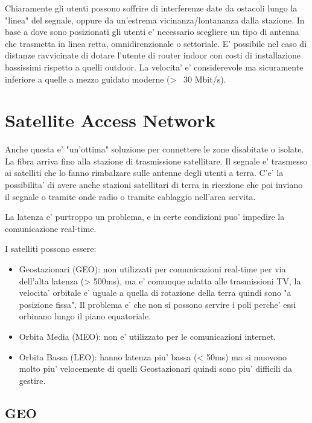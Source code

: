 
Chiaramente gli utenti possono soffrire di interferenze date da ostacoli lungo la "linea" del segnale, oppure da un'estrema vicinanza/lontananza dalla stazione.
In base a dove sono posizionati gli utenti e' necessario scegliere un tipo di antenna che trasmetta in linea retta, omnidirenzionale o settoriale.
E' possibile nel caso di distanze ravvicinate di dotare l'utente di router indoor con costi di installazione bassissimi rispetto a quelli outdoor.
La velocita' e' considerevole ma sicuramente inferiore a quelle a mezzo guidato moderne (> ~30 Mbit/s).

\section{Satellite Access Network}

Anche questa e' "un'ottima" soluzione per connettere le zone disabitate o isolate. La fibra arriva fino alla stazione di trasmissione satellitare. Il segnale e' trasmesso ai satelliti che lo fanno rimbalzare sulle antenne degli utenti a terra.
C'e' la possibilita' di avere anche stazioni satellitari di terra in ricezione che poi inviano il segnale o tramite onde radio o tramite cablaggio nell'area servita.

La latenza e' purtroppo un problema, e in certe condizioni puo' impedire la comunicazione real-time.


I satelliti possono essere:

\begin{itemize}
  \item Geostazionari (GEO): non utilizzati per comunicazioni real-time per via dell'alta latenza (> 500ms), ma e' comunque adatta alle trasmissioni TV, la velocita' orbitale e' uguale a quella di rotazione della terra quindi sono "a posizione fissa". Il problema e' che non si possono servire i poli perche' essi orbinano lungo il piano equatoriale.
  \item Orbita Media (MEO): non e' utilizzato per le comunicazioni internet.
  \item Orbita Bassa (LEO): hanno latenza piu' bassa (< 50ms) ma si muovono molto piu' velocemente di quelli Geostazionari quindi sono piu' difficili da gestire.
\end{itemize}

\subsection{GEO}

